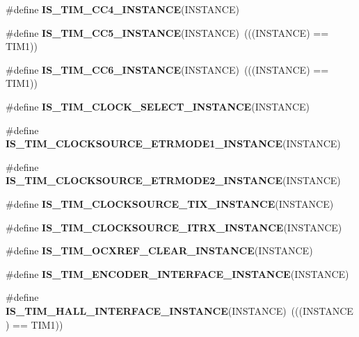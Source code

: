 \begin{DoxyCompactItemize}
\#define {\bfseries I\+S\+\_\+\+T\+I\+M\+\_\+\+C\+C4\+\_\+\+I\+N\+S\+T\+A\+N\+CE}(I\+N\+S\+T\+A\+N\+CE)
\item 
\mbox{\label{group___exported__macro_ga792dfa11e701c0e2dad3ed9e6b32fdff}} 
\#define {\bfseries I\+S\+\_\+\+T\+I\+M\+\_\+\+C\+C5\+\_\+\+I\+N\+S\+T\+A\+N\+CE}(I\+N\+S\+T\+A\+N\+CE)~(((I\+N\+S\+T\+A\+N\+CE) == T\+I\+M1))
\item 
\mbox{\label{group___exported__macro_ga41866b98e60d00f42889a97271d2fefa}} 
\#define {\bfseries I\+S\+\_\+\+T\+I\+M\+\_\+\+C\+C6\+\_\+\+I\+N\+S\+T\+A\+N\+CE}(I\+N\+S\+T\+A\+N\+CE)~(((I\+N\+S\+T\+A\+N\+CE) == T\+I\+M1))
\item 
\#define {\bfseries I\+S\+\_\+\+T\+I\+M\+\_\+\+C\+L\+O\+C\+K\+\_\+\+S\+E\+L\+E\+C\+T\+\_\+\+I\+N\+S\+T\+A\+N\+CE}(I\+N\+S\+T\+A\+N\+CE)
\item 
\#define {\bfseries I\+S\+\_\+\+T\+I\+M\+\_\+\+C\+L\+O\+C\+K\+S\+O\+U\+R\+C\+E\+\_\+\+E\+T\+R\+M\+O\+D\+E1\+\_\+\+I\+N\+S\+T\+A\+N\+CE}(I\+N\+S\+T\+A\+N\+CE)
\item 
\#define {\bfseries I\+S\+\_\+\+T\+I\+M\+\_\+\+C\+L\+O\+C\+K\+S\+O\+U\+R\+C\+E\+\_\+\+E\+T\+R\+M\+O\+D\+E2\+\_\+\+I\+N\+S\+T\+A\+N\+CE}(I\+N\+S\+T\+A\+N\+CE)
\item 
\#define {\bfseries I\+S\+\_\+\+T\+I\+M\+\_\+\+C\+L\+O\+C\+K\+S\+O\+U\+R\+C\+E\+\_\+\+T\+I\+X\+\_\+\+I\+N\+S\+T\+A\+N\+CE}(I\+N\+S\+T\+A\+N\+CE)
\item 
\#define {\bfseries I\+S\+\_\+\+T\+I\+M\+\_\+\+C\+L\+O\+C\+K\+S\+O\+U\+R\+C\+E\+\_\+\+I\+T\+R\+X\+\_\+\+I\+N\+S\+T\+A\+N\+CE}(I\+N\+S\+T\+A\+N\+CE)
\item 
\#define {\bfseries I\+S\+\_\+\+T\+I\+M\+\_\+\+O\+C\+X\+R\+E\+F\+\_\+\+C\+L\+E\+A\+R\+\_\+\+I\+N\+S\+T\+A\+N\+CE}(I\+N\+S\+T\+A\+N\+CE)
\item 
\#define {\bfseries I\+S\+\_\+\+T\+I\+M\+\_\+\+E\+N\+C\+O\+D\+E\+R\+\_\+\+I\+N\+T\+E\+R\+F\+A\+C\+E\+\_\+\+I\+N\+S\+T\+A\+N\+CE}(I\+N\+S\+T\+A\+N\+CE)
\item 
\mbox{\label{group___exported__macro_gacdcc047699e2d83c9d2b3a3f8375dff4}} 
\#define {\bfseries I\+S\+\_\+\+T\+I\+M\+\_\+\+H\+A\+L\+L\+\_\+\+I\+N\+T\+E\+R\+F\+A\+C\+E\+\_\+\+I\+N\+S\+T\+A\+N\+CE}(I\+N\+S\+T\+A\+N\+CE)~(((I\+N\+S\+T\+A\+N\+CE) == T\+I\+M1))
\item 
\mbox{\label{group___exported__macro_ga979ea18ba0931f5ed15cc2f3ac84794b}} 

\end{DoxyCompactItemize}
